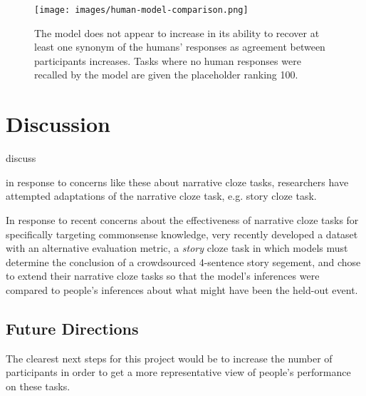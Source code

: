 \documentclass[10pt,a4paper]{article}
\newcommand{\todo}[1]{{\color{red}#1}}
\begin{document}
% 
% 
% 
% 
% 

\begin{figure}
 \centering
 \texttt{[image: images/human-model-comparison.png]}
 \caption{The model does not appear to increase in its ability to recover at least one synonym of the humans' responses as agreement between participants increases. Tasks where no human responses were recalled by the model are given the placeholder ranking 100.}
 \label{fig:human-model-comparison}
\end{figure}

\section{Discussion}

\todo{discuss}

\todo{in response to concerns like these about narrative cloze tasks, researchers have attempted adaptations of the narrative cloze task, e.g. story cloze task.}

In response to recent concerns about the effectiveness of narrative cloze tasks for specifically targeting commonsense knowledge,  very recently developed a dataset with an alternative evaluation metric, a {\em story} cloze task in which models must determine the conclusion of a crowdsourced 4-sentence story segement, and  chose to extend their narrative cloze tasks so that the model's inferences were compared to people's inferences about what might have been the held-out event.

\subsection{Future Directions}

The clearest next steps for this project would be to increase the number of participants in order to get a more representative view of people's performance on these tasks.
\end{document}
